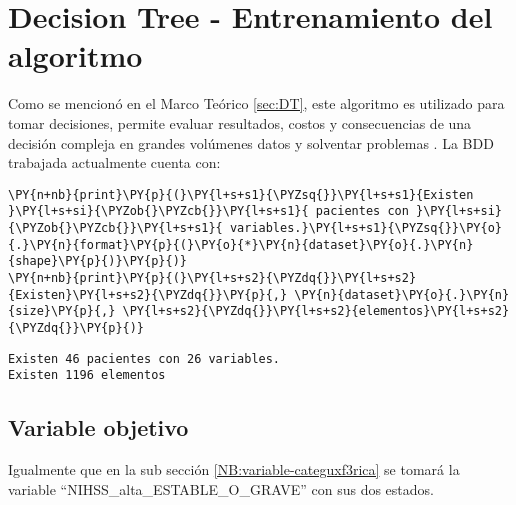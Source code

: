     \hypertarget{decision-tree---entrenamiento-del-algoritmo}{%
\section{Decision Tree - Entrenamiento del algoritmo}\label{decision-tree---entrenamiento-del-algoritmo}}

	Como se mencionó en el Marco Teórico \ref{sec:DT}, este algoritmo es utilizado para tomar decisiones, permite evaluar resultados, costos y consecuencias de una decisión compleja en grandes volúmenes datos y solventar problemas \cite{Harrington2012}.
	La BDD trabajada actualmente cuenta con:

    \begin{tcolorbox}[breakable, size=fbox, boxrule=1pt, pad at break*=1mm,colback=cellbackground, colframe=cellborder]
\begin{Verbatim}[commandchars=\\\{\}]
\PY{n+nb}{print}\PY{p}{(}\PY{l+s+s1}{\PYZsq{}}\PY{l+s+s1}{Existen }\PY{l+s+si}{\PYZob{}\PYZcb{}}\PY{l+s+s1}{ pacientes con }\PY{l+s+si}{\PYZob{}\PYZcb{}}\PY{l+s+s1}{ variables.}\PY{l+s+s1}{\PYZsq{}}\PY{o}{.}\PY{n}{format}\PY{p}{(}\PY{o}{*}\PY{n}{dataset}\PY{o}{.}\PY{n}{shape}\PY{p}{)}\PY{p}{)}
\PY{n+nb}{print}\PY{p}{(}\PY{l+s+s2}{\PYZdq{}}\PY{l+s+s2}{Existen}\PY{l+s+s2}{\PYZdq{}}\PY{p}{,} \PY{n}{dataset}\PY{o}{.}\PY{n}{size}\PY{p}{,} \PY{l+s+s2}{\PYZdq{}}\PY{l+s+s2}{elementos}\PY{l+s+s2}{\PYZdq{}}\PY{p}{)}
\end{Verbatim}
\end{tcolorbox}

    \begin{Verbatim}[commandchars=\\\{\}]
Existen 46 pacientes con 26 variables.
Existen 1196 elementos
    \end{Verbatim}

    \hypertarget{variable-categuxf3rica}{%
\subsection{Variable objetivo}\label{variable-categuxf3rica}}

	Igualmente que en la sub sección \ref{NB:variable-categuxf3rica} se tomará la variable ``NIHSS\_alta\_ESTABLE\_O\_GRAVE'' con sus dos estados.

